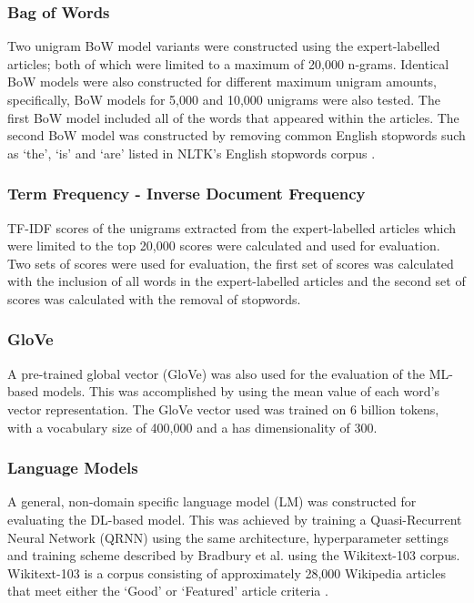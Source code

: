 \documentclass[a4paper,twoside,phd]{BYUPhys}
\begin{document}
\subsubsection{Bag of Words}
\label{sec:FeatureSelectionBoW}
Two unigram BoW model variants were constructed using the expert-labelled articles; both of which were limited to a maximum of 20,000 n-grams. Identical BoW models were also constructed for different maximum unigram amounts, specifically, BoW models for 5,000 and 10,000 unigrams were also tested. The first BoW model included all of the words that appeared within the articles. The second BoW model was constructed by removing common English stopwords such as `the', `is' and `are' listed in NLTK's English stopwords corpus \cite{Bird2009}.

\subsubsection{Term Frequency - Inverse Document Frequency}
\label{sec:FeatureSelectionTFIDF}
TF-IDF scores of the unigrams extracted from the expert-labelled articles which were limited to the top 20,000 scores were calculated and used for evaluation. Two sets of scores were used for evaluation, the first set of scores was calculated with the inclusion of all words in the expert-labelled articles and the second set of scores was calculated with the removal of stopwords.

\subsubsection{GloVe}
\label{sec:FeatureSelectionGloVe}

A pre-trained global vector (GloVe) \cite{pennington2014glove} was also used for the evaluation of the ML-based models. This was accomplished by using the mean value of each word's vector representation. The GloVe vector used was trained on 6 billion tokens, with a vocabulary size of 400,000 and a has dimensionality of 300.

\subsubsection{Language Models}
\label{sec:FeatureSelectionLM}

A general, non-domain specific language model (LM) was constructed for evaluating the DL-based model. This was achieved by training a Quasi-Recurrent Neural Network (QRNN) using the same architecture, hyperparameter settings and training scheme described by Bradbury et al. \cite{bradbury2016quasi} using the Wikitext-103 corpus. Wikitext-103 is a corpus consisting of approximately 28,000 Wikipedia articles that meet either the `Good' or `Featured' article criteria \cite{Merity2016}. \newline
\end{document}
